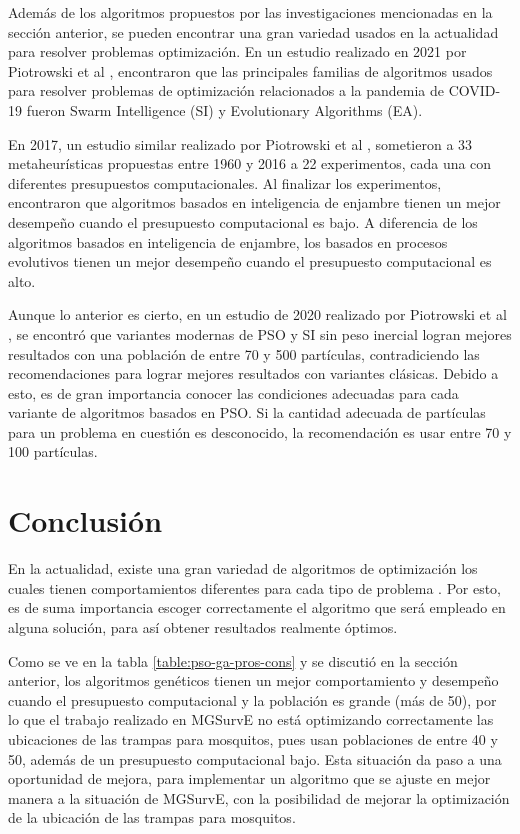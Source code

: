 \documentclass[letterpaper]{report}
\begin{document}
  Además de los algoritmos propuestos por las investigaciones mencionadas en la 
  sección anterior, se pueden encontrar una gran variedad usados en la
  actualidad para 
  resolver problemas optimización. En un estudio realizado en 2021 por
  Piotrowski et al \cite{DE&PSOCov}, encontraron que las principales familias de
  algoritmos usados para resolver problemas de optimización relacionados a la 
  pandemia de COVID-19 fueron Swarm Intelligence (SI) y Evolutionary Algorithms
  (EA). 

  En 2017, un estudio similar realizado por Piotrowski et al \cite{SwarmVsEvol},
  sometieron a 33 metaheurísticas propuestas entre 1960 y 2016 a 22
  experimentos, cada una con diferentes presupuestos computacionales.
  Al finalizar los experimentos, encontraron que algoritmos basados en
  inteligencia de enjambre tienen un mejor desempeño cuando el presupuesto
  computacional es bajo. A diferencia de los algoritmos basados en inteligencia
  de enjambre, los basados en procesos evolutivos tienen un mejor desempeño
  cuando el presupuesto computacional es alto. 
  
  Aunque lo anterior es cierto, en un estudio de 2020 realizado por Piotrowski
  et al \cite{PSOPopulationSize}, se encontró que variantes modernas de PSO y
  SI sin peso inercial
  logran mejores resultados con una población de entre 70 y 500 partículas,
  contradiciendo las recomendaciones para lograr mejores resultados con
  variantes clásicas.
  Debido a esto, es de gran importancia conocer las condiciones adecuadas para
  cada variante de algoritmos basados en PSO. Si la cantidad adecuada de
  partículas para un problema en cuestión es desconocido, la recomendación es
  usar entre 70 y 100 partículas.

\section{Conclusión}
  En la actualidad, existe una gran variedad de algoritmos de optimización los
  cuales tienen comportamientos diferentes para cada tipo de problema
  \cite{SwarmVsEvol}. Por esto, es de suma importancia escoger correctamente el
  algoritmo que será empleado en alguna solución, para así obtener resultados
  realmente óptimos.

  Como se ve en la tabla \ref{table:pso-ga-pros-cons} y se discutió en la
  sección anterior, los algoritmos genéticos tienen un mejor comportamiento y
  desempeño cuando el presupuesto computacional y la población es grande
  (más de 50), por lo que el trabajo realizado en MGSurvE \cite{MGSurvE} no
  está optimizando correctamente las ubicaciones de las trampas para mosquitos,
  pues usan poblaciones de entre 40 y 50, además de un presupuesto computacional
  bajo. Esta situación da paso a una oportunidad de mejora, para implementar un
  algoritmo que se ajuste en mejor manera a la situación de MGSurvE, con la
  posibilidad de mejorar la optimización de la ubicación de las trampas para
  mosquitos.
\end{document}
